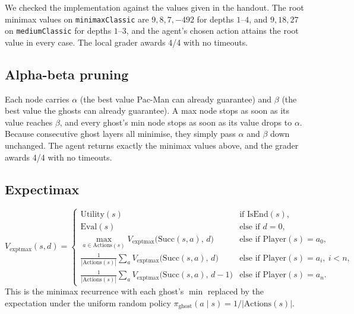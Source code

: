 We checked the implementation against the values given in the handout. The root minimax values on
\texttt{minimaxClassic} are $9,8,7,-492$ for depths $1$--$4$, and $9,18,27$ on \texttt{mediumClassic} for depths
$1$--$3$, and the agent's chosen action attains the root value in every case. The local grader awards 4/4 with no
timeouts.

\subsection{Alpha-beta pruning}
Each node carries $\alpha$ (the best value Pac-Man can already guarantee) and $\beta$ (the best value the ghosts can
already guarantee). A max node stops as soon as its value reaches $\beta$, and every ghost's min node stops as soon as its
value drops to $\alpha$. Because consecutive ghost layers all minimise, they simply pass $\alpha$ and $\beta$
down unchanged. The agent returns exactly the minimax values above, and the grader awards 4/4 with no timeouts.

\subsection{Expectimax}

\begin{solution}
\[
V_{\text{exptmax}}(s,d)=
\begin{cases}
\text{Utility}(s) & \text{if } \text{IsEnd}(s),\\[2pt]
\text{Eval}(s) & \text{else if } d=0,\\[2pt]
\displaystyle\max_{a\in\text{Actions}(s)} V_{\text{exptmax}}\bigl(\text{Succ}(s,a),\,d\bigr) & \text{else if } \text{Player}(s)=a_0,\\[8pt]
\displaystyle\frac{1}{|\text{Actions}(s)|}\sum_{a} V_{\text{exptmax}}\bigl(\text{Succ}(s,a),\,d\bigr) & \text{else if } \text{Player}(s)=a_i,\ i<n,\\[8pt]
\displaystyle\frac{1}{|\text{Actions}(s)|}\sum_{a} V_{\text{exptmax}}\bigl(\text{Succ}(s,a),\,d-1\bigr) & \text{else if } \text{Player}(s)=a_n.
\end{cases}
\]
This is the minimax recurrence with each ghost's $\min$ replaced by the expectation under the uniform random
policy $\pi_{\text{ghost}}(a\mid s)=1/|\text{Actions}(s)|$.
\end{solution}

